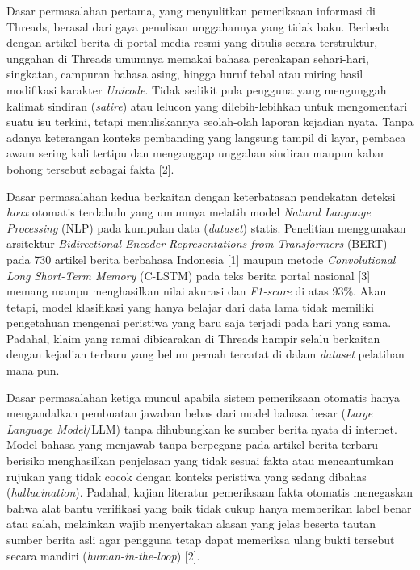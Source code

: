 \documentclass[12pt,a4paper,twoside]{report}
\begin{document}
Dasar permasalahan pertama, yang menyulitkan pemeriksaan informasi di Threads, berasal dari gaya penulisan unggahannya yang tidak baku. Berbeda dengan artikel berita di portal media resmi yang ditulis secara terstruktur, unggahan di Threads umumnya memakai bahasa percakapan sehari-hari, singkatan, campuran bahasa asing, hingga huruf tebal atau miring hasil modifikasi karakter \textit{Unicode}. Tidak sedikit pula pengguna yang mengunggah kalimat sindiran (\textit{satire}) atau lelucon yang dilebih-lebihkan untuk mengomentari suatu isu terkini, tetapi menuliskannya seolah-olah laporan kejadian nyata. Tanpa adanya keterangan konteks pembanding yang langsung tampil di layar, pembaca awam sering kali tertipu dan menganggap unggahan sindiran maupun kabar bohong tersebut sebagai fakta [2].

Dasar permasalahan kedua berkaitan dengan keterbatasan pendekatan deteksi \textit{hoax} otomatis terdahulu yang umumnya melatih model \textit{Natural Language Processing} (NLP) pada kumpulan data (\textit{dataset}) statis. Penelitian menggunakan arsitektur \textit{Bidirectional Encoder Representations from Transformers} (BERT) pada 730 artikel berita berbahasa Indonesia [1] maupun metode \textit{Convolutional Long Short-Term Memory} (C-LSTM) pada teks berita portal nasional [3] memang mampu menghasilkan nilai akurasi dan \textit{F1-score} di atas 93\%. Akan tetapi, model klasifikasi yang hanya belajar dari data lama tidak memiliki pengetahuan mengenai peristiwa yang baru saja terjadi pada hari yang sama. Padahal, klaim yang ramai dibicarakan di Threads hampir selalu berkaitan dengan kejadian terbaru yang belum pernah tercatat di dalam \textit{dataset} pelatihan mana pun.

Dasar permasalahan ketiga muncul apabila sistem pemeriksaan otomatis hanya mengandalkan pembuatan jawaban bebas dari model bahasa besar (\textit{Large Language Model}/LLM) tanpa dihubungkan ke sumber berita nyata di internet. Model bahasa yang menjawab tanpa berpegang pada artikel berita terbaru berisiko menghasilkan penjelasan yang tidak sesuai fakta atau mencantumkan rujukan yang tidak cocok dengan konteks peristiwa yang sedang dibahas (\textit{hallucination}). Padahal, kajian literatur pemeriksaan fakta otomatis menegaskan bahwa alat bantu verifikasi yang baik tidak cukup hanya memberikan label benar atau salah, melainkan wajib menyertakan alasan yang jelas beserta tautan sumber berita asli agar pengguna tetap dapat memeriksa ulang bukti tersebut secara mandiri (\textit{human-in-the-loop}) [2].
\end{document}
